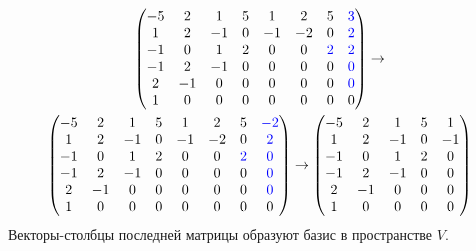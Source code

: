 \documentclass[12pt]{article}
\begin{document}
\begin{enumerate}
\begin{gather*}
            \begin{pmatrix}
                -5 & 2  & 1  & 5 & 1  & 2  & 5                   & \textcolor{blue}{3} \\
                1  & 2  & -1 & 0 & -1 & -2 & 0                   & \textcolor{blue}{2} \\
                -1 & 0  & 1  & 2 & 0  & 0  & \textcolor{blue}{2} & \textcolor{blue}{2} \\
                -1 & 2  & -1 & 0 & 0  & 0  & 0                   & \textcolor{blue}{0} \\
                2  & -1 & 0  & 0 & 0  & 0  & 0                   & \textcolor{blue}{0} \\
                1  & 0  & 0  & 0 & 0  & 0  & 0                   & 0
            \end{pmatrix}
            \rightarrow \\
            \begin{pmatrix}
                -5 & 2  & 1  & 5 & 1  & 2  & 5                   & \textcolor{blue}{-2} \\
                1  & 2  & -1 & 0 & -1 & -2 & 0                   & \textcolor{blue}{2}  \\
                -1 & 0  & 1  & 2 & 0  & 0  & \textcolor{blue}{2} & \textcolor{blue}{0}  \\
                -1 & 2  & -1 & 0 & 0  & 0  & 0                   & \textcolor{blue}{0}  \\
                2  & -1 & 0  & 0 & 0  & 0  & 0                   & \textcolor{blue}{0}  \\
                1  & 0  & 0  & 0 & 0  & 0  & 0                   & 0
            \end{pmatrix}
            \rightarrow
            \begin{pmatrix}
                -5 & 2  & 1  & 5 & 1  \\
                1  & 2  & -1 & 0 & -1 \\
                -1 & 0  & 1  & 2 & 0  \\
                -1 & 2  & -1 & 0 & 0  \\
                2  & -1 & 0  & 0 & 0  \\
                1  & 0  & 0  & 0 & 0
            \end{pmatrix}
        \end{gather*}
        Векторы-столбцы последней матрицы образуют базис в пространстве $V$.
    \end{enumerate}
\end{document}
